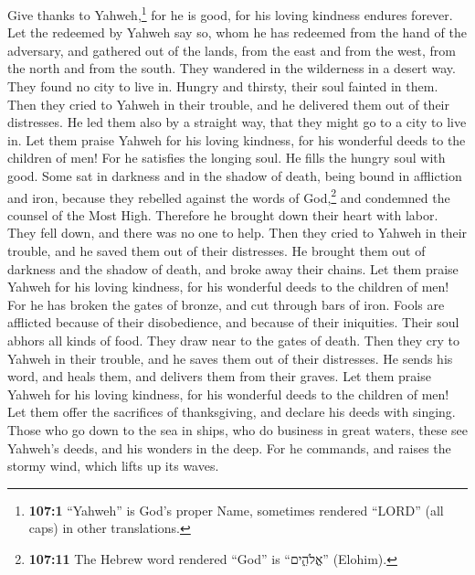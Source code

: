  Give thanks to Yahweh,\footnote{\textbf{107:1} ``Yahweh''
  is God's proper Name, sometimes rendered ``LORD'' (all caps) in other
  translations.} for he is good, for his loving kindness endures
forever.  Let the redeemed by Yahweh say so, whom he has
redeemed from the hand of the adversary,  and gathered out
of the lands, from the east and from the west, from the north and from
the south.  They wandered in the wilderness in a desert
way. They found no city to live in.  Hungry and thirsty,
their soul fainted in them.  Then they cried to Yahweh in
their trouble, and he delivered them out of their distresses.
 He led them also by a straight way, that they might go to
a city to live in.  Let them praise Yahweh for his loving
kindness, for his wonderful deeds to the children of men! 
For he satisfies the longing soul. He fills the hungry soul with good.
 Some sat in darkness and in the shadow of death, being
bound in affliction and iron,  because they rebelled
against the words of God,\footnote{\textbf{107:11} The Hebrew word
  rendered ``God'' is ``אֱלֹהִ֑ים'' (Elohim).} and condemned the counsel
of the Most High.  Therefore he brought down their heart
with labor. They fell down, and there was no one to help.
 Then they cried to Yahweh in their trouble, and he saved
them out of their distresses.  He brought them out of
darkness and the shadow of death, and broke away their chains.
 Let them praise Yahweh for his loving kindness, for his
wonderful deeds to the children of men!  For he has
broken the gates of bronze, and cut through bars of iron.
 Fools are afflicted because of their disobedience, and
because of their iniquities.  Their soul abhors all kinds
of food. They draw near to the gates of death.  Then they
cry to Yahweh in their trouble, and he saves them out of their
distresses.  He sends his word, and heals them, and
delivers them from their graves.  Let them praise Yahweh
for his loving kindness, for his wonderful deeds to the children of men!
 Let them offer the sacrifices of thanksgiving, and
declare his deeds with singing.  Those who go down to the
sea in ships, who do business in great waters,  these see
Yahweh's deeds, and his wonders in the deep.  For he
commands, and raises the stormy wind, which lifts up its waves.
